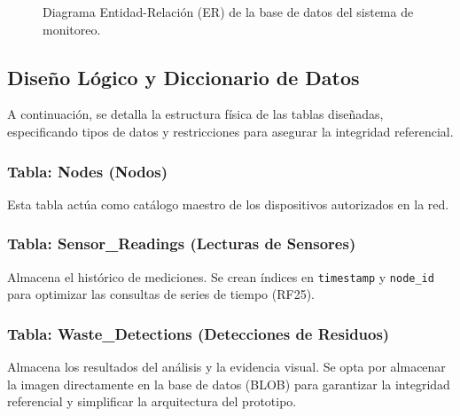 \begin{figure}[h]
  \centering
  
  \caption{Diagrama Entidad-Relación (ER) de la base de datos del sistema de monitoreo.}
  \label{fig:diagrama_er}
\end{figure}


\subsection{Diseño Lógico y Diccionario de Datos}
\label{subsec:diccionario_datos}

A continuación, se detalla la estructura física de las tablas diseñadas, especificando tipos de datos y restricciones para asegurar la integridad referencial.

\subsubsection*{Tabla: Nodes (Nodos)}
Esta tabla actúa como catálogo maestro de los dispositivos autorizados en la red.


\subsubsection*{Tabla: Sensor\_Readings (Lecturas de Sensores)}
Almacena el histórico de mediciones. Se crean índices en \texttt{timestamp} y \texttt{node\_id} para optimizar las consultas de series de tiempo (RF25).



\subsubsection*{Tabla: Waste\_Detections (Detecciones de Residuos)}
Almacena los resultados del análisis y la evidencia visual. Se opta por almacenar la imagen directamente en la base de datos (BLOB) para garantizar la integridad referencial y simplificar la arquitectura del prototipo.

